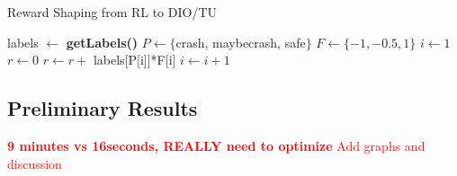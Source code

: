 \begin{algorithm}[H]
  \caption{Reward Shaping from RL to DIO/TU}
  \begin{algorithmic}[1]
      
      \State labels $\gets$ \textbf{getLabels()} 
      \State $P \gets \{$crash, maybecrash, safe$\}$  
      \State $F \gets \{-1,-0.5,1\}$ 
      \State $i \gets 1$
      \State $r \gets 0$
         \State $r \gets r +$ labels[P[i]]*F[i] 
         \State $i \gets i+1$


      \EndWhile
      
      \EndProcedure
      
      \end{algorithmic}
      \end{algorithm}

    \subsection{Preliminary Results}
    \textcolor{red}{\textbf{9 minutes vs 16seconds, REALLY need to optimize} 
    Add graphs and discussion}